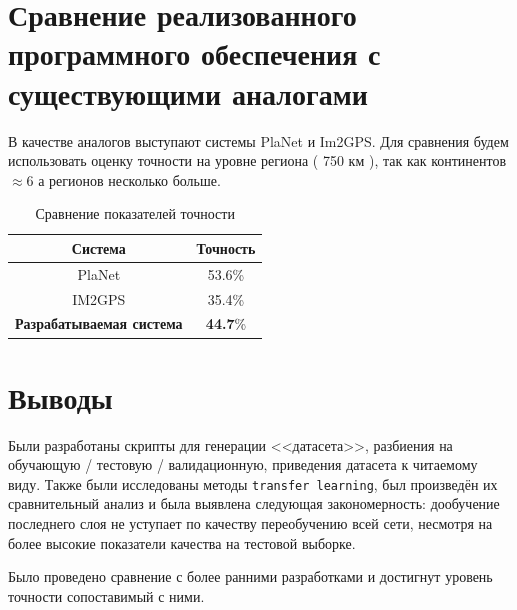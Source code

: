 \section{Сравнение реализованного программного обеспечения с существующими аналогами}

В качестве аналогов выступают системы PlaNet и Im2GPS.
Для сравнения будем использовать оценку точности на уровне 
региона ( 750 км ), так как континентов $ \approx 6 $ а регионов несколько больше.

\begin{table}[h]
\centering
\begin{tabu}{c|c}

Система	& Точность \\ \hline
PlaNet	& 53.6\% \\  
IM2GPS	& 35.4\% \\  
\textbf{Разрабатываемая система}& \textbf{44.7}\%  \\ \hline 
\end{tabu}
\caption{Сравнение показателей точности} 
\end{table}

\section{Выводы}

Были разработаны скрипты для генерации <<датасета>>, разбиения на  обучающую / тестовую / валидационную, приведения датасета к читаемому виду. Также были исследованы методы \texttt{transfer learning}, был произведён их сравнительный анализ и была выявлена следующая закономерность: дообучение последнего слоя не уступает по качеству переобучению всей сети, несмотря на более высокие показатели качества на тестовой выборке.

Было проведено сравнение с более ранними разработками и достигнут уровень точности
сопоставимый с ними.
